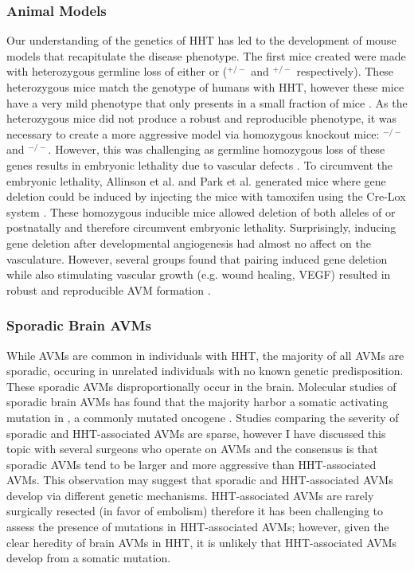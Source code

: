 \subsubsection{Animal Models}
Our understanding of the genetics of HHT has led to the development of mouse models that recapitulate the disease phenotype. The first mice created were made with heterozygous germline loss of either  or  ($^{+/-}$ and $^{+/-}$ respectively). These heterozygous mice match the genotype of humans with HHT, however these mice have a very mild phenotype that only presents in a small fraction of mice \citep{bourdeau1999, torsney2003, srinivasan2003}. As the heterozygous mice did not produce a robust and reproducible phenotype, it was necessary to create a more aggressive model via homozygous knockout mice: $^{-/-}$ and $^{-/-}$. However, this was challenging as germline homozygous loss of these genes results in embryonic lethality due to vascular defects \citep{li1999, bourdeau1999, oh2000, arthur2000}. To circumvent the embryonic lethality, Allinson et al. and Park et al. generated mice where gene deletion could be induced by injecting the mice with tamoxifen using the Cre-Lox system \citep{allinson2007, park2008}. These homozygous inducible mice allowed deletion of both alleles of  or  postnatally and therefore circumvent embryonic lethality. Surprisingly, inducing gene deletion after developmental angiogenesis had almost no affect on the vasculature. However, several groups found that pairing induced gene deletion while also stimulating vascular growth (e.g. wound healing, VEGF) resulted in robust and reproducible AVM formation \citep{park2008, walker2011, choi2012, chen2013}.

\subsubsection{Sporadic Brain AVMs}
While AVMs are common in individuals with HHT, the majority of all AVMs are sporadic, occuring in unrelated individuals with no known genetic predisposition. These sporadic AVMs disproportionally occur in the brain. Molecular studies of sporadic brain AVMs has found that the majority harbor a somatic activating mutation in , a commonly mutated oncogene \citep{nikolaev2018, starke2018, alolabi2018}. Studies comparing the severity of sporadic and HHT-associated AVMs are sparse, however I have discussed this topic with several surgeons who operate on AVMs and the consensus is that sporadic AVMs tend to be larger and more aggressive than HHT-associated AVMs. This observation may suggest that sporadic and HHT-associated AVMs develop via different genetic mechanisms. HHT-associated AVMs are rarely surgically resected (in favor of embolism) therefore it has been challenging to assess the presence of  mutations in HHT-associated AVMs; however, given the clear heredity of brain AVMs in HHT, it is unlikely that HHT-associated AVMs develop from a somatic  mutation. 



